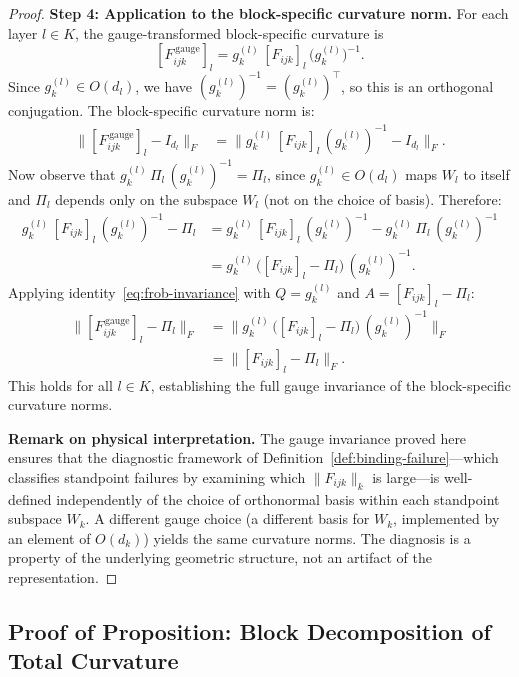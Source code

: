\begin{proof}
\medskip\noindent\textbf{Step 4: Application to the block-specific curvature norm.}
For each layer $l \in K$, the gauge-transformed block-specific curvature is
\[
    [F_{ijk}^{\,\mathrm{gauge}}]_l = g_k^{(l)}\, [F_{ijk}]_l\, \big(g_k^{(l)}\big)^{-1}.
\]
Since $g_k^{(l)} \in O(d_l)$, we have $(g_k^{(l)})^{-1} = (g_k^{(l)})^\top$, so this is
an orthogonal conjugation. The block-specific curvature norm is:
\begin{align*}
    \big\|[F_{ijk}^{\,\mathrm{gauge}}]_l - I_{d_l}\big\|_F
    &= \big\|g_k^{(l)}\, [F_{ijk}]_l\, (g_k^{(l)})^{-1} - I_{d_l}\big\|_F.
\end{align*}
Now observe that $g_k^{(l)}\, \Pi_l\, (g_k^{(l)})^{-1} = \Pi_l$, since $g_k^{(l)} \in
O(d_l)$ maps $W_l$ to itself and $\Pi_l$ depends only on the subspace $W_l$ (not on the
choice of basis). Therefore:
\begin{align*}
    g_k^{(l)}\, [F_{ijk}]_l\, (g_k^{(l)})^{-1} - \Pi_l
    &= g_k^{(l)}\, [F_{ijk}]_l\, (g_k^{(l)})^{-1}
       - g_k^{(l)}\, \Pi_l\, (g_k^{(l)})^{-1} \\
    &= g_k^{(l)}\, \big([F_{ijk}]_l - \Pi_l\big)\, (g_k^{(l)})^{-1}.
\end{align*}
Applying identity~\eqref{eq:frob-invariance} with $Q = g_k^{(l)}$ and $A = [F_{ijk}]_l -
\Pi_l$:
\begin{align*}
    \big\|[F_{ijk}^{\,\mathrm{gauge}}]_l - \Pi_l\big\|_F
    &= \big\|g_k^{(l)}\, \big([F_{ijk}]_l - \Pi_l\big)\,
       (g_k^{(l)})^{-1}\big\|_F \\
    &= \big\|[F_{ijk}]_l - \Pi_l\big\|_F.
\end{align*}
This holds for all $l \in K$, establishing the full gauge invariance of the
block-specific curvature norms.

\medskip\noindent\textbf{Remark on physical interpretation.} The gauge invariance proved
here ensures that the diagnostic framework of Definition~\ref{def:binding-failure}---which
classifies standpoint failures by examining which $\|F_{ijk}\|_k$ is large---is
well-defined independently of the choice of orthonormal basis within each standpoint
subspace $W_k$. A different gauge choice (a different basis for $W_k$, implemented by an
element of $O(d_k)$) yields the same curvature norms. The diagnosis is a property of the
underlying geometric structure, not an artifact of the representation.
\end{proof}

\subsection{Proof of Proposition: Block Decomposition of Total Curvature}
\label{app:proof-block-decomposition}


